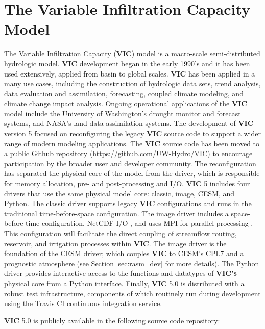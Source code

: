 \section{The Variable Infiltration Capacity Model}
\label{sec:vic_dev}
The Variable Infiltration Capacity (\textbf{VIC}) model is a macro-scale semi-distributed hydrologic model.
\textbf{VIC} development began in the early 1990's and it has been used extensively, applied from basin to global scales.
\textbf{VIC} has been applied in a many use cases, including the construction of hydrologic data sets, trend analysis, data evaluation and assimilation, forecasting, coupled climate modeling, and climate change impact analysis.
Ongoing operational applications of the \textbf{VIC} model include the University of Washington's drought monitor and forecast systems, and NASA's land data assimilation systems.
The development of \textbf{VIC} version 5 focused on reconfiguring the legacy \textbf{VIC} source code to support a wider range of modern modeling applications.
The \textbf{VIC} source code has been moved to a public Github repository (https://github.com/UW-Hydro/VIC) to encourage participation by the broader user and developer community.
The reconfiguration has separated the physical core of the model from the driver, which is responsible for memory allocation, pre- and post-processing and I/O.
\textbf{VIC} 5 includes four drivers that use the same physical model core: classic, image, CESM, and Python.
The classic driver supports legacy \textbf{VIC} configurations and runs in the traditional time-before-space configuration.
The image driver includes a space-before-time configuration, NetCDF I/O \citep{Rew_1990}, and uses MPI for parallel processing \citep{Gropp_1996}.
This configuration will facilitate the direct coupling of streamflow routing, reservoir, and irrigation processes within \textbf{VIC}.
The image driver is the foundation of the CESM driver; which couples \textbf{VIC} to CESM's CPL7 \citep{Craig_2012} and a prognostic atmosphere (see Section \ref{sec:rasm_dev} for more details).
The Python driver provides interactive access to the functions and datatypes of \textbf{VIC's} physical core from a Python interface.
Finally, \textbf{VIC} 5.0 is distributed with a robust test infrastructure, components of which routinely run during development using the Travis CI continuous integration service.

\textbf{VIC} 5.0 is publicly available in the following source code repository:


